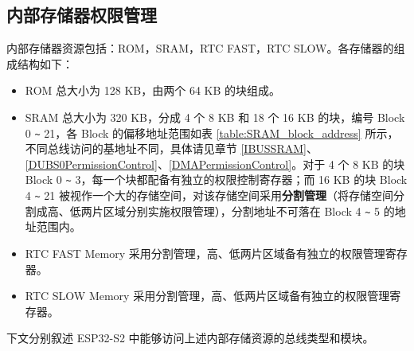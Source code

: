 \documentclass[main\_\_CN.tex]{subfiles}
\begin{document}
\subsection{内部存储器权限管理}
内部存储器资源包括：ROM，SRAM，RTC FAST，RTC SLOW。各存储器的组成结构如下：
\begin{itemize}
    \item ROM 总大小为 128 KB，由两个 64 KB 的块组成。
    \item SRAM 总大小为 320 KB，分成 4 个 8 KB 和 18 个 16 KB 的块，编号 Block 0 \verb+~+ 21，各 Block 的偏移地址范围如表 \ref{table:SRAM_block_address} 所示，不同总线访问的基地址不同，具体请见章节 \ref{IBUSSRAM}、\ref{DUBS0PermissionControl}、\ref{DMAPermissionControl}。对于 4 个 8 KB 的块 Block 0 \verb+~+ 3，每一个块都配备有独立的权限控制寄存器；而 16 KB 的块 Block 4 \verb+~+ 21 被视作一个大的存储空间，对该存储空间采用\textbf{分割管理}（将存储空间分割成高、低两片区域分别实施权限管理），分割地址不可落在 Block 4 \verb+~+ 5 的地址范围内。
    \item RTC FAST Memory 采用分割管理，高、低两片区域备有独立的权限管理寄存器。
    \item RTC SLOW Memory 采用分割管理，高、低两片区域备有独立的权限管理寄存器。
\end{itemize}

下文分别叙述 ESP32-S2 中能够访问上述内部存储资源的总线类型和模块。
\end{document}
